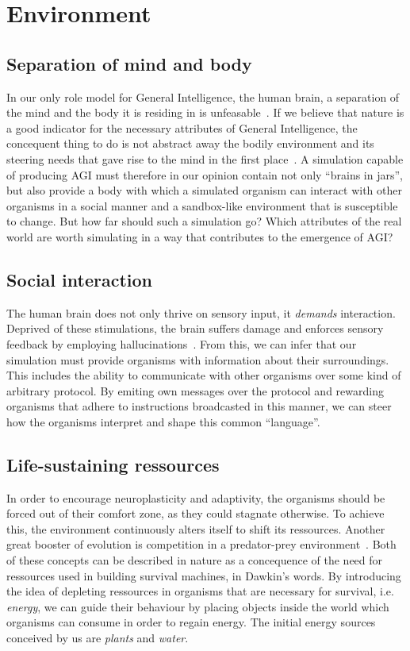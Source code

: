 \section{Environment}

\subsection{Separation of mind and body}
In our only role model for General Intelligence, the human brain, a separation of the mind and
the body it is residing in is unfeasable~\cite{Dudai2014}. If we believe that nature is a good 
indicator for the necessary attributes of General Intelligence, the concequent thing to do is not 
abstract away the bodily environment and its steering needs that gave rise to the mind in the first place~\cite{Jekely2010}. 
A simulation capable of producing AGI must therefore in our opinion contain not only ``brains in jars'', but 
also provide a body with which a simulated organism can interact with other organisms in a social manner and a 
sandbox-like environment that is susceptible to change.
But how far should such a simulation go? Which attributes of the real world are worth simulating in a way 
that contributes to the emergence of AGI\@?

\subsection{Social interaction}
The human brain does not only thrive on sensory input, it
\emph{demands} interaction. Deprived of these stimulations,
the brain suffers damage and enforces sensory feedback by employing
hallucinations~\cite{Grassian2006}. From this, we can infer that
our simulation must provide organisms with information about their surroundings.
This includes the ability to communicate with other organisms over some
kind of arbitrary protocol. By emiting own messages over the protocol and
rewarding organisms that adhere to instructions broadcasted in this manner,
we can steer how the organisms interpret and shape this common ``language''.

\subsection{Life-sustaining ressources}
In order to encourage neuroplasticity and adaptivity, the organisms should be 
forced out of their comfort zone, as they could stagnate otherwise.
To achieve this, the environment continuously alters itself to shift its ressources.
Another great booster of evolution is competition in a predator-prey environment~\cite{Dawkins1982}.
Both of these concepts can be described in nature as a concequence of the need for ressources 
used in building survival machines, in Dawkin's words. 
By introducing the idea of depleting ressources in organisms that are necessary for survival, 
i.e. \emph{energy}, we can guide their behaviour by placing objects inside the world which organisms can consume
in order to regain energy. The initial energy sources conceived by us are \emph{plants} and \emph{water}.


